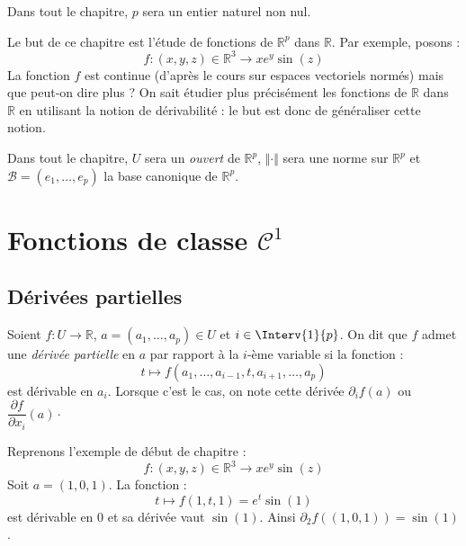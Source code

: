 \documentclass[a4paper,10pt]{report}
\begin{document}


\noindent Dans tout le chapitre, $p$ sera un entier naturel non nul.

\medskip

\noindent Le but de ce chapitre est l'étude de fonctions de $\mathbb{R}^p$ dans $\mathbb{R}$. Par exemple, posons :
$$ f : (x,y,z) \in \mathbb{R}^3 \rightarrow xe^y\sin(z) $$ 
La fonction $f$ est continue (d'après le cours sur espaces vectoriels normés) mais que peut-on dire plus ? On sait étudier plus précisément les fonctions de $\mathbb{R}$ dans $\mathbb{R}$ en utilisant la notion de dérivabilité : le but est donc de généraliser cette notion.

\medskip

\noindent Dans tout le chapitre, $U$ sera un \textit{ouvert} de $\mathbb{R}^p$, $\Vert \cdot \Vert$ sera une norme sur $\mathbb{R}^p$ et $\mathcal{B}= (e_1, \ldots, e_p)$ la base canonique de $\mathbb{R}^p$.

\section{Fonctions de classe $\mathcal{C}^1$}
\subsection{Dérivées partielles}
\begin{defin} Soient $f : U \rightarrow \mathbb{R}$, $a =(a_1, \ldots, a_p) \in U$ et $i \in \Interv{1}{p}$. On dit que $f$ admet une \textit{dérivée partielle} en $a$ par rapport à la $i$-ème variable si la fonction :
$$ t \mapsto f(a_1, \ldots, a_{i-1}, t, a_{i+1}, \ldots, a_p) $$
est dérivable en $a_i$. Lorsque c'est le cas, on note cette dérivée $\partial_i f(a)$ ou $\dfrac{\partial f}{\partial x_i }(a)\cdot$
\end{defin}



\begin{ex} Reprenons l'exemple de début de chapitre : 
 $$f : (x,y,z) \in \mathbb{R}^3 \rightarrow xe^y\sin(z)$$
Soit $a=(1,0,1)$. La fonction :
$$ t \mapsto f(1,t,1) = e^t \sin(1)$$
est dérivable en $0$ et sa dérivée vaut $\sin(1)$. Ainsi $\partial_2 f((1,0,1))=\sin(1)$.
\end{ex}
\end{document}
